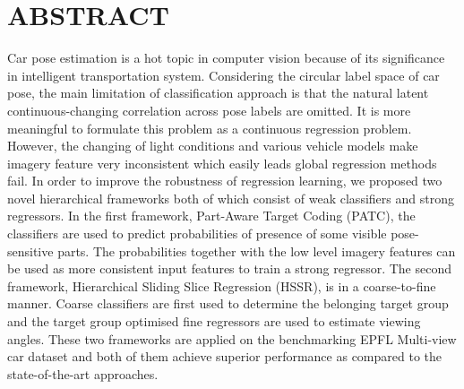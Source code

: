 \documentclass{tutmscthesis}[2010/09/22]
\numberwithin{equation}{section}
\numberwithin{table}{section}
\numberwithin{figure}{section}
\begin{document}
\tableofcontents



\renewcommand\listfigurename{List of Figures}  %
\listoffigures                                 %
\markboth{}{}                                  %

\renewcommand\listtablename{List of Tables}    %
\listoftables                                  %
\markboth{}{} 






\setlength{\parskip}{3ex}

\newpage 
{}
\setcounter{page}{1}
\section*{ABSTRACT}\label{sec:abs}
Car pose estimation is a hot topic in computer vision because of its significance in intelligent transportation system. 
Considering the circular label space of car pose, the main limitation of classification approach is that the natural latent continuous-changing correlation across pose labels are omitted. 
It is more meaningful to formulate this problem as a continuous regression problem. 
However, the changing of light conditions and various vehicle models make imagery feature very inconsistent which easily leads global regression methods fail.  
In order to improve the robustness of regression learning, we proposed two novel hierarchical  frameworks both of which consist of weak classifiers and strong regressors. 
In the first framework, Part-Aware Target Coding (PATC), the classifiers are used to predict probabilities of presence of some visible pose-sensitive parts. 
The probabilities together with the low level imagery features can be used as more consistent input features to train a strong regressor.
The second framework, Hierarchical Sliding Slice Regression (HSSR), is in a coarse-to-fine manner. 
Coarse classifiers are first used to determine the belonging target group and the target group optimised fine regressors are used to estimate viewing angles.
These two frameworks are applied on the benchmarking EPFL Multi-view car dataset and both of them achieve superior performance as compared to the state-of-the-art approaches. 
\end{document}

